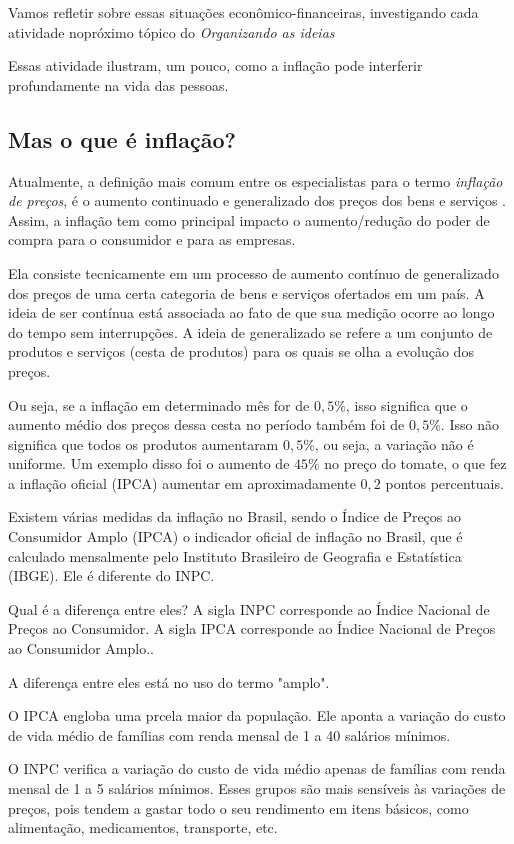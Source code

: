 Vamos refletir sobre essas situações econômico-financeiras, investigando cada atividade nopróximo tópico do \textit{Organizando as ideias}

\clearpage
{}
\label{fin-arg-7}

Essas atividade ilustram, um pouco, como a inflação pode interferir profundamente na vida das pessoas. 

\subsection{Mas o que é inflação?}

Atualmente, a definição mais comum entre os especialistas para o termo \textit{inflação de preços}, é o aumento continuado e generalizado dos preços dos bens e serviços \citep{ecb2017}. Assim, a inflação tem como principal impacto o aumento/redução do poder de compra para o consumidor e para as empresas.

Ela consiste tecnicamente em um processo de aumento contínuo de generalizado dos preços de uma certa categoria de bens e serviços ofertados em um país. A ideia de ser contínua está associada ao fato de que sua medição ocorre ao longo do tempo sem interrupções. A ideia de generalizado se refere a um conjunto de produtos e serviços (cesta de produtos) para os quais se olha a evolução dos preços.

 Ou seja, se a inflação em determinado mês for de $0{,}5$\%, isso significa que o aumento médio dos preços dessa cesta no período também foi de $0,5$\%. Isso não significa que todos os produtos aumentaram $0{,}5$\%, ou seja, a variação não é uniforme. Um exemplo disso foi o aumento de $45$\% no preço do tomate, o que fez a inflação oficial (IPCA) aumentar em aproximadamente $0{,}2$ pontos percentuais.

 Existem várias medidas da inflação no Brasil, sendo o Índice de Preços ao Consumidor Amplo (IPCA) o indicador oficial de inflação no Brasil, que é calculado mensalmente pelo Instituto Brasileiro de Geografia e Estatística (IBGE). Ele é diferente do INPC.

\begin{observationtitle}{Qual é a diferença entre eles?}
A sigla INPC corresponde ao Índice Nacional de Preços ao Consumidor. A sigla IPCA corresponde ao Índice Nacional de Preços ao Consumidor Amplo..

A diferença entre eles está no uso do termo "amplo".

O IPCA engloba uma prcela maior da população. Ele aponta a variação do custo de vida médio de famílias com renda mensal de 1 a 40 salários mínimos.

O INPC verifica a variação do custo de vida médio apenas de famílias com renda mensal de 1 a 5 salários mínimos. Esses grupos são mais sensíveis às variações de preços, pois tendem a gastar todo o seu rendimento em itens básicos, como alimentação, medicamentos, transporte, etc.
\end{observationtitle}

